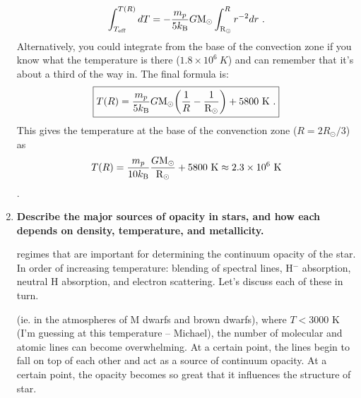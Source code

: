 \begin{enumerate}
	\begin{equation}
	\int^{T(R)}_{T_{\rm eff}} dT = -\frac{m_p}{5 k_{\rm B}} G {\rm M}_\odot \int^R_{\rm R_\odot} r^{-2}dr \,\, .
	\end{equation}
	Alternatively, you could integrate from the base of the convection zone if you know what the temperature is there ($1.8 \times 10^6~K$) and can remember that it's about a third of the way in. The final formula is:
	\begin{equation}\boxed{
	T(R) = \frac{m_p}{5 k_{\rm B}} G {\rm M}_\odot \biggl( \frac{1}{R} - \frac{1}{{\rm R}_\odot}\biggr) + 5800~{\rm K}\,\, .
	}\end{equation}
    This gives the temperature at the base of the convenction zone ($R=2R_\odot/3$) as
    \begin{dmath*}
	    T(R) = \frac{m_p}{10 k_{\rm B}} \frac{G {\rm M}_\odot}{{\rm R}_\odot} + 5800~{\rm K} \nolinebreak
             \approx 2.3\times10^6~{\rm K}
    \end{dmath*}.
	
\item \textbf{Describe the major sources of opacity in stars, and how each depends on density,
      temperature, and metallicity.}
      
       regimes that are important for determining the
      continuum opacity of the star.  In order of increasing temperature: blending of
      spectral lines, H$^-$ absorption, neutral H absorption, and electron scattering.
      Let's discuss each of these in turn.

       (ie. in the atmospheres of M dwarfs and brown dwarfs),
      where $T<3000$ K (I'm guessing at this temperature -- Michael), the number of molecular
      and atomic lines can become overwhelming.  At a certain point, the lines begin to fall
      on top of each other and act as a source of continuum opacity.  At a certain point, the
      opacity becomes so great that it influences the structure of star.


\end{enumerate}
